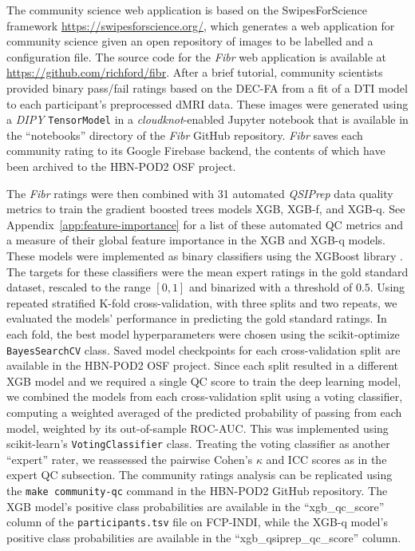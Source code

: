 \documentclass[9pt,lineno]{elife}
\begin{document}
The community science web application is based on the SwipesForScience framework
\url{https://swipesforscience.org/}, which generates a web application for
community science given an open repository of images to be labelled and a
configuration file. The source code for the \emph{Fibr} web application is
available at \url{https://github.com/richford/fibr}. After a brief tutorial,
community scientists provided binary pass/fail ratings based on the DEC-FA from
a fit of a DTI model to each participant's preprocessed dMRI data. These images were
generated using a \emph{DIPY} \citep{dipy} \texttt{TensorModel} in a
\emph{cloudknot}-enabled Jupyter notebook that is available in the ``notebooks''
directory of the \emph{Fibr} GitHub repository. \emph{Fibr} saves each community
rating to its Google Firebase backend, the contents of which have been archived
to the HBN-POD2 OSF project.

The \emph{Fibr} ratings were then combined with 31 automated \emph{QSIPrep} data quality
metrics to train the gradient boosted trees models XGB, XGB-f, and XGB-q. See Appendix~\ref{app:feature-importance} for a list of these automated QC metrics and a measure of their global feature importance in the XGB and XGB-q models. These
models were implemented as binary classifiers using the XGBoost library
\citep{xgboost}. The targets for these classifiers were the mean expert ratings
in the gold standard dataset, rescaled to the range $[0, 1]$ and binarized with
a threshold of $0.5$. Using repeated
stratified K-fold cross-validation, with three splits and two repeats, we
evaluated the models' performance in predicting the gold standard ratings. In
each fold, the best model hyperparameters were chosen using the scikit-optimize
\citep{scikit-optimize} \texttt{BayesSearchCV} class. Saved model checkpoints for
each cross-validation split are available in the HBN-POD2 OSF project. Since
each split resulted in a different XGB model and we required a single QC score
to train the deep learning model, we combined the models from each
cross-validation split using a voting classifier, computing a weighted averaged
of the predicted probability of passing from each model, weighted by its
out-of-sample ROC-AUC. This was implemented using scikit-learn's
\texttt{VotingClassifier} class. Treating the voting classifier as another
``expert'' rater, we reassessed the pairwise Cohen's $\kappa$ and ICC scores as
in the expert QC subsection. The community ratings analysis can be replicated
using the \texttt{make community-qc} command in the HBN-POD2 GitHub repository.
The XGB model's positive class probabilities are available in the
``xgb\_qc\_score'' column of the \texttt{participants.tsv} file on FCP-INDI, while
the XGB-q model's positive class probabilities are available in the
``xgb\_qsiprep\_qc\_score'' column.
\end{document}

